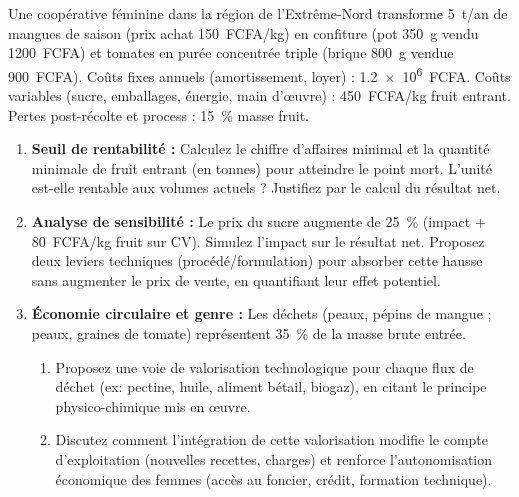 \documentclass[11pt]{article}
\begin{document}
\begin{exercice}
Une coopérative féminine dans la région de l'Extrême-Nord transforme \SI{5}{t/an} de mangues de saison (prix achat \SI{150}{FCFA/kg}) en confiture (pot \SI{350}{g} vendu \SI{1200}{FCFA}) et tomates en purée concentrée triple (brique \SI{800}{g} vendue \SI{900}{FCFA}). Coûts fixes annuels (amortissement, loyer) : \SI{1.2e6}{FCFA}. Coûts variables (sucre, emballages, énergie, main d'œuvre) : \SI{450}{FCFA/kg} fruit entrant. Pertes post-récolte et process : \SI{15}{\%} masse fruit.

\begin{enumerate}
    \item \textbf{Seuil de rentabilité :} Calculez le chiffre d'affaires minimal et la quantité minimale de fruit entrant (en tonnes) pour atteindre le point mort. L'unité est-elle rentable aux volumes actuels ? Justifiez par le calcul du résultat net.
    \item \textbf{Analyse de sensibilité :} Le prix du sucre augmente de \SI{25}{\%} (impact + \SI{80}{FCFA/kg} fruit sur CV). Simulez l'impact sur le résultat net. Proposez deux leviers techniques (procédé/formulation) pour absorber cette hausse sans augmenter le prix de vente, en quantifiant leur effet potentiel.
    \item \textbf{Économie circulaire et genre :} Les déchets (peaux, pépins de mangue ; peaux, graines de tomate) représentent \SI{35}{\%} de la masse brute entrée. 
    \begin{enumerate}
        \item Proposez une voie de valorisation technologique pour chaque flux de déchet (ex: pectine, huile, aliment bétail, biogaz), en citant le principe physico-chimique mis en œuvre.
        \item Discutez comment l'intégration de cette valorisation modifie le compte d'exploitation (nouvelles recettes, charges) et renforce l'autonomisation économique des femmes (accès au foncier, crédit, formation technique).
    \end{enumerate}
\end{enumerate}
\end{exercice}
\end{document}
